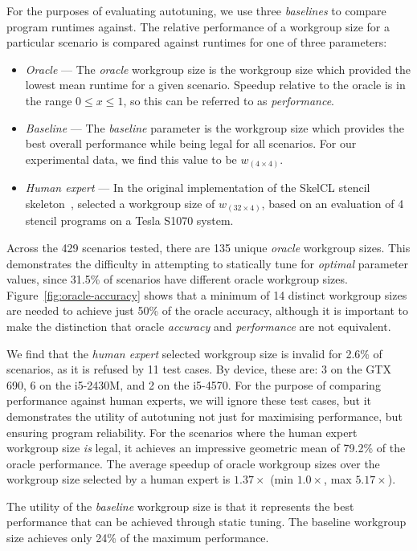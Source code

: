 \documentclass[nonatbib,preprint,9pt]{sigplanconf}
\begin{document}
For the purposes of evaluating autotuning, we use three
\emph{baselines} to compare program runtimes against. The relative
performance of a workgroup size for a particular scenario is compared
against runtimes for one of three parameters:
%
\begin{itemize}
\item \emph{Oracle} --- The \emph{oracle} workgroup size is the
  workgroup size which provided the lowest mean runtime for a given
  scenario. Speedup relative to the oracle is in the range
  $0 \le x \le 1$, so this can be referred to as \emph{performance}.
\item \emph{Baseline} --- The \emph{baseline} parameter is the
  workgroup size which provides the best overall performance while
  being legal for all scenarios. For our experimental data, we find
  this value to be $w_{(4 \times 4)}$.
\item \emph{Human expert} --- In the original implementation of the
  SkelCL stencil skeleton~\cite{Steuwer2014a},
  \citeauthor{Steuwer2014a} selected a workgroup size of
  $w_{(32 \times 4)}$, based on an evaluation of 4 stencil programs on
  a Tesla S1070 system.
\end{itemize}
%
Across the 429 scenarios tested, there are 135 unique \emph{oracle}
workgroup sizes. This demonstrates the difficulty in attempting to
statically tune for \emph{optimal} parameter values, since 31.5\% of
scenarios have different oracle workgroup
sizes. Figure~\ref{fig:oracle-accuracy} shows that a minimum of 14
distinct workgroup sizes are needed to achieve just 50\% of the oracle
accuracy, although it is important to make the distinction that oracle
\emph{accuracy} and \emph{performance} are not equivalent.

We find that the \emph{human expert} selected workgroup size is
invalid for 2.6\% of scenarios, as it is refused by 11 test cases. By
device, these are: 3 on the GTX 690, 6 on the i5-2430M, and 2 on the
i5-4570. For the purpose of comparing performance against human
experts, we will ignore these test cases, but it demonstrates the
utility of autotuning not just for maximising performance, but
ensuring program reliability. For the scenarios where the human expert
workgroup size \emph{is} legal, it achieves an impressive geometric
mean of 79.2\% of the oracle performance. The average speedup of
oracle workgroup sizes over the workgroup size selected by a human
expert is $1.37\times$ (min $1.0\times$, max $5.17\times$).

The utility of the \emph{baseline} workgroup size is that it
represents the best performance that can be achieved through static
tuning. The baseline workgroup size achieves only 24\% of the maximum
performance.
\end{document}
